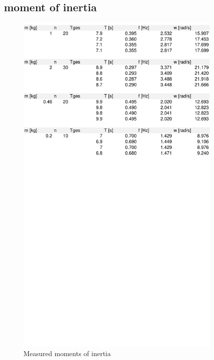 \documentclass{scrreprt}
\begin{document}
\subsection{moment of inertia}
\begin{figure}[H]
	\centering
  \includegraphics[width=0.9\textwidth]{diag/inertia.pdf}
	\caption{Measured moments of inertia}
	\label{fig:inertia}
\end{figure}
\end{document}
